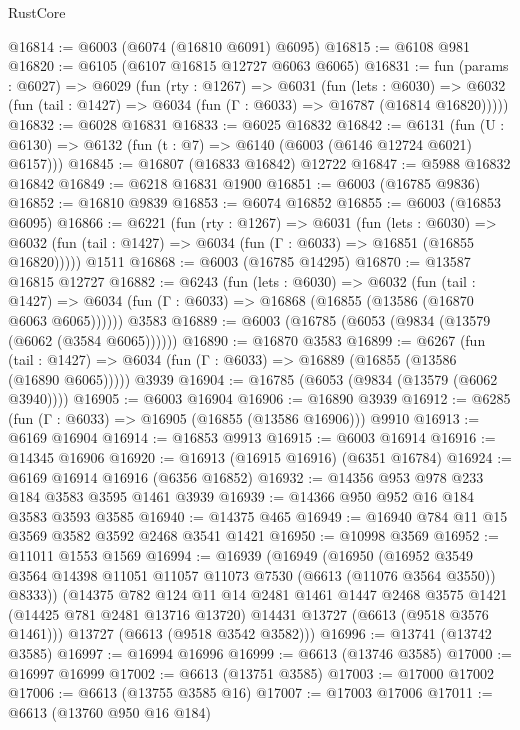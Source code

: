 \begin{lexlean}{RustCore}
\begin{coremodule}
@16814 := @6003 (@6074 (@16810 @6091) @6095)
@16815 := @6108 @981
@16820 := @6105 (@6107 @16815 @12727 @6063 @6065)
@16831 := fun (params : @6027) =>
  @6029
    (fun (rty : @1267) =>
    @6031
      (fun (lets : @6030) =>
      @6032 (fun (tail : @1427) => @6034 (fun (Γ : @6033) => @16787 (@16814 @16820)))))
@16832 := @6028 @16831
@16833 := @6025 @16832
@16842 := @6131
    (fun (U : @6130) => @6132 (fun (t : @7) => @6140 (@6003 (@6146 @12724 @6021) @6157)))
@16845 := @16807 (@16833 @16842) @12722
@16847 := @5988 @16832 @16842
@16849 := @6218 @16831 @1900
@16851 := @6003 (@16785 @9836)
@16852 := @16810 @9839
@16853 := @6074 @16852
@16855 := @6003 (@16853 @6095)
@16866 := @6221
    (fun (rty : @1267) =>
    @6031
      (fun (lets : @6030) =>
      @6032 (fun (tail : @1427) => @6034 (fun (Γ : @6033) => @16851 (@16855 @16820)))))
    @1511
@16868 := @6003 (@16785 @14295)
@16870 := @13587 @16815 @12727
@16882 := @6243
    (fun (lets : @6030) =>
    @6032
      (fun (tail : @1427) =>
      @6034 (fun (Γ : @6033) => @16868 (@16855 (@13586 (@16870 @6063 @6065))))))
    @3583
@16889 := @6003 (@16785 (@6053 (@9834 (@13579 (@6062 (@3584 @6065))))))
@16890 := @16870 @3583
@16899 := @6267
    (fun (tail : @1427) => @6034 (fun (Γ : @6033) => @16889 (@16855 (@13586 (@16890 @6065)))))
    @3939
@16904 := @16785 (@6053 (@9834 (@13579 (@6062 @3940))))
@16905 := @6003 @16904
@16906 := @16890 @3939
@16912 := @6285 (fun (Γ : @6033) => @16905 (@16855 (@13586 @16906))) @9910
@16913 := @6169 @16904
@16914 := @16853 @9913
@16915 := @6003 @16914
@16916 := @14345 @16906
@16920 := @16913 (@16915 @16916) (@6351 @16784)
@16924 := @6169 @16914 @16916 (@6356 @16852)
@16932 := @14356 @953 @978 @233 @184 @3583 @3595 @1461 @3939
@16939 := @14366 @950 @952 @16 @184 @3583 @3593 @3585
@16940 := @14375 @465
@16949 := @16940 @784 @11 @15 @3569 @3582 @3592 @2468 @3541 @1421
@16950 := @10998 @3569
@16952 := @11011 @1553 @1569
@16994 := @16939
    (@16949
      (@16950
        (@16952 @3549 @3564 @14398 @11051 @11057 @11073 @7530 (@6613 (@11076 @3564 @3550)) @8333))
      (@14375
        @782
        @124
        @11
        @14
        @2481
        @1461
        @1447
        @2468
        @3575
        @1421
        (@14425 @781 @2481 @13716 @13720)
        @14431
        @13727
        (@6613 (@9518 @3576 @1461)))
      @13727
      (@6613 (@9518 @3542 @3582)))
@16996 := @13741 (@13742 @3585)
@16997 := @16994 @16996
@16999 := @6613 (@13746 @3585)
@17000 := @16997 @16999
@17002 := @6613 (@13751 @3585)
@17003 := @17000 @17002
@17006 := @6613 (@13755 @3585 @16)
@17007 := @17003 @17006
@17011 := @6613 (@13760 @950 @16 @184)

\end{coremodule}
\end{lexlean}
